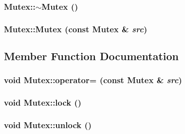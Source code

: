 \subsubsection{\setlength{\rightskip}{0pt plus 5cm}Mutex::$\sim$Mutex ()\hspace{0.3cm}{\tt  [inline]}}\label{classMutex_c9e9182407f5f74892318607888e9be4}


\subsubsection{\setlength{\rightskip}{0pt plus 5cm}Mutex::Mutex (const {\bf Mutex} \& {\em src})\hspace{0.3cm}{\tt  [private]}}\label{classMutex_7f1ad3a125c7a02b2ca338240bd1d978}




\subsection{Member Function Documentation}
\subsubsection{\setlength{\rightskip}{0pt plus 5cm}void Mutex::operator= (const {\bf Mutex} \& {\em src})\hspace{0.3cm}{\tt  [private]}}\label{classMutex_030a11400d00ef97813c6b232a5e3f43}


\subsubsection{\setlength{\rightskip}{0pt plus 5cm}void Mutex::lock ()\hspace{0.3cm}{\tt  [inline, private]}}\label{classMutex_d91be808bf0a60a16f10b897ec246d3a}


\subsubsection{\setlength{\rightskip}{0pt plus 5cm}void Mutex::unlock ()\hspace{0.3cm}{\tt  [inline, private]}}\label{classMutex_546a5b797ba29959357586aa2b3740a8}




